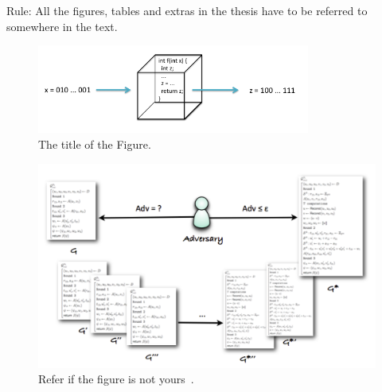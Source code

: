 \documentclass[12pt]{article}
\begin{document}
Rule: All the figures, tables and extras in the thesis have to be referred to somewhere in the text.


\begin{figure} [ht] %
\begin{center}
\includegraphics[width=0.8\textwidth]{computational_model_function}
\caption{The title of the Figure.}
\label{fig:fnCompModel}
\end{center}
\end{figure}



\begin{figure} [!ht] %
\begin{center}
\includegraphics[width=\textwidth]{game-based_proofs}
\caption{Refer if the figure is not yours~\cite{kamm12}.}
\label{fig:game-based_proofs}
\end{center}
\end{figure}
\end{document}

